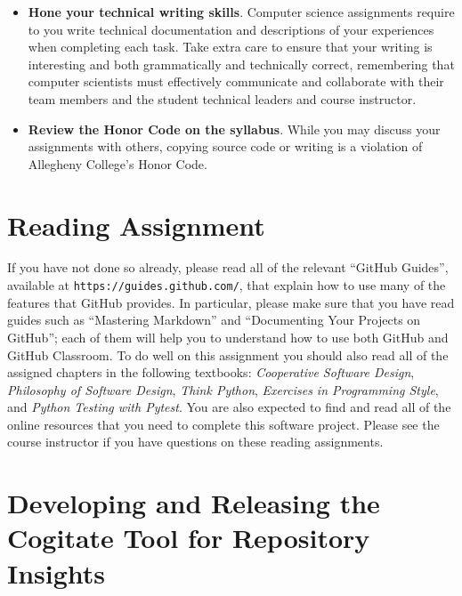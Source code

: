 \documentclass[11pt]{article}
\newcommand{\cooperative}{{\em Cooperative Software Design\/}}
\newcommand{\philosophy}{{\em Philosophy of Software Design\/}}
\newcommand{\thinkpython}{{\em Think Python\/}}
\newcommand{\programmingstyle}{{\em Exercises in Programming Style\/}}
\newcommand{\pytest}{{\em Python Testing with Pytest\/}}
\newcommand{\url}[1]{\lstinline{#1}}
\begin{document}
\begin{itemize}
\item {\bf Hone your technical writing skills}. Computer science assignments
  require to you write technical documentation and descriptions of your
  experiences when completing each task. Take extra care to ensure that your
  writing is interesting and both grammatically and technically correct,
  remembering that computer scientists must effectively communicate and
  collaborate with their team members and the student technical leaders and
  course instructor.

\item {\bf Review the Honor Code on the syllabus}. While you may discuss your
  assignments with others, copying source code or writing is a violation of
  Allegheny College's Honor Code.

\end{itemize}

\section*{Reading Assignment}



If you have not done so already, please read all of the relevant ``GitHub
Guides'', available at \url{https://guides.github.com/}, that explain how to use
many of the features that GitHub provides. In particular, please make sure that
you have read guides such as ``Mastering Markdown'' and ``Documenting Your
Projects on GitHub''; each of them will help you to understand how to use both
GitHub and GitHub Classroom.
%
To do well on this assignment you should also read all of the assigned chapters
in the following textbooks: \cooperative, \philosophy, \thinkpython,
\programmingstyle, and \pytest.
%
You are also expected to find and read all of the online resources that you need
to complete this software project.
%
Please see the course instructor if you have questions on these reading
assignments.

\section*{Developing and Releasing the Cogitate Tool for Repository Insights}

\end{document}
